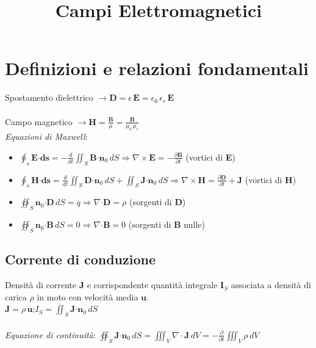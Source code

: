 \documentclass[a4paper]{article}
\begin{document}
\title{Campi Elettromagnetici}
\date{}
\maketitle

\section{Definizioni e relazioni fondamentali\\}

Spostamento dielettrico $\rightarrow \textbf{D} = \epsilon\,\textbf{E} = \epsilon_0\,\epsilon_r\,\textbf{E}$\\\\Campo magnetico $\rightarrow \textbf{H} = \frac{\textbf{B}}{\mu} = \frac{\textbf{B}}{\mu_0\,\mu_r}$\\

\emph{Equazioni di Maxwell}:

\begin{itemize}
\item $\oint_{s} \textbf{E·ds} = -\frac{d}{dt} \iint_{S} \textbf{B·n}_0 \,dS \Rightarrow \nabla\times\textbf{E} = -\frac{\partial\textbf{B}}{\partial t}$ (vortici di \textbf{E})

\item $\oint_{s} \textbf{H·ds} = \frac{d}{dt} \iint_{S} \textbf{D·n}_0 \,dS + \iint_{S}\textbf{J·n}_0 \,dS \Rightarrow \nabla\times\textbf{H} = \frac{\partial\textbf{D}}{\partial t} + \textbf{J}$ (vortici di \textbf{H})

\item$\oiint_{S}\textbf{n}_0\textbf{·D}\,dS = q \Rightarrow \nabla\textbf{·D} = \rho$ (sorgenti di \textbf{D})

\item$\oiint_{S}\textbf{n}_0\textbf{·B}\,dS = 0 \Rightarrow \nabla\textbf{·B} = 0$ (sorgenti di \textbf{B} nulle)
\end{itemize}

\subsection*{Corrente di conduzione}
Densità di corrente $\textbf{J}$ e corrispondente quantità integrale $\textbf{I}_S$ associata a densità di carica $\rho$ in moto con velocità media $\textbf{u}$.\\

$\textbf{J} = \rho\,\textbf{u}$;\hspace{10mm}$I_S = \iint_{S}\textbf{J·}\textbf{n}_0\,dS$\\\\
\emph{Equazione di continuità}: $\oiint_{S}\textbf{J·}\textbf{n}_0\,dS = \iiint_{V}\nabla\cdot\textbf{J}\,dV = -\frac{\partial}{\partial t}\iiint_{V}\rho\,dV$\\
\end{document}
